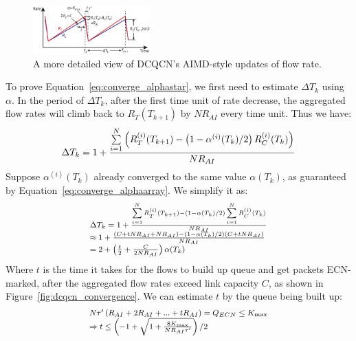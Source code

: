 \begin{figure}[t]
\center
\includegraphics[width=0.4\textwidth]{figures/dcqcn_convergence.eps}
\caption{A more detailed view of DCQCN's AIMD-style updates of flow rate.}
\label{fig:dcqcn_convergence_detailed}
\end{figure}

To prove Equation~\ref{eq:converge_alphastar}, we first need to estimate $\Delta T_k$
using $\alpha$. In the period of $\Delta T_k$, after the first time unit of rate
decrease, the aggregated flow rates will climb back to $R_T(T_{k+1})$ by
$NR_{AI}$ every time unit.  Thus we have:
\begin{equation}
\small\Delta {T_k} = 1 + \frac{{\sum\limits_{i = 1}^N {\left( {R_T^{(i)}({T_{k + 1}}) - \left( {1 - {\alpha ^{(i)}}({T_k})/2} \right)R_C^{(i)}({T_k})} \right)} }}{{N{R_{AI}}}}
\end{equation}
Suppose $\alpha^{(i)}({T_k})$ already converged to the same value $\alpha ({T_k})$, as guaranteed by
Equation~\ref{eq:converge_alphaarray}. We simplify it as:
\begin{equation}
\small
\begin{array}{l}
\Delta {T_k} = 1 + \frac{{\sum\limits_{i = 1}^N {R_T^{(i)}({T_{k + 1}})}  - \left( {1 - \alpha ({T_k})/2} \right)\sum\limits_{i = 1}^N {R_C^{(i)}({T_k})} }}{{N{R_{AI}}}}\\
 \approx 1 + \frac{{\left( {C + tN{R_{AI}} + N{R_{AI}}} \right) - \left( {1 - \alpha ({T_k})/2} \right)\left( {C + tN{R_{AI}}} \right)}}{{N{R_{AI}}}}\\
 = 2 + \left( {\frac{t}{2} + \frac{C}{{2N{R_{AI}}}}} \right)\alpha ({T_k})
\end{array}
\label{eq:converge_tk}
\end{equation}
Where $t$ is the time it takes for the flows to build up queue and get packets ECN-marked, after
the aggregated flow rates exceed link capacity $C$, as shown in Figure~\ref{fig:dcqcn_convergence}.
We can estimate $t$ by the queue being built up:
\begin{equation}
\small
\begin{array}{l}
N\tau '\left( {{R_{AI}} + 2{R_{AI}} + ... + t{R_{AI}}} \right) = {Q_{ECN}} \le {K_{\max }}\\
 \Rightarrow t \le \left( { - 1 + \sqrt {1 + \frac{{8{K_{\max }}}}{{N{R_{AI}}\tau '}}} } \right)/2
\end{array}
\end{equation}
